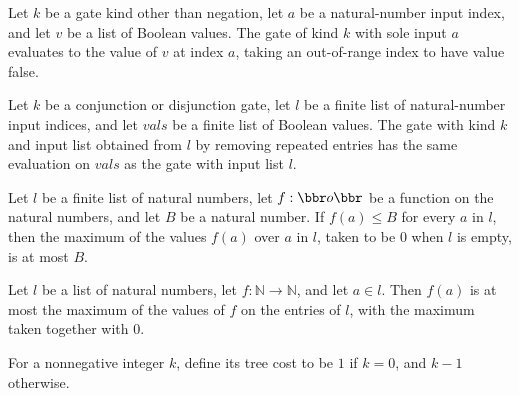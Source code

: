 \begin{theorem}
\label{BoolCircuit.DAGGate.eval_singleton}
\leanok
{}
Let $k$ be a gate kind other than negation, let $a$ be a natural-number input index, and
let $v$ be a list of Boolean values. The gate of kind $k$ with sole input $a$ evaluates
to the value of $v$ at index $a$, taking an out-of-range index to have value false.
\end{theorem}

\begin{theorem}
\label{BoolCircuit.DAGGate.eval_dedup}
\leanok
{}
Let $k$ be a conjunction or disjunction gate, let $l$ be a finite list of natural-number
input indices, and let $vals$ be a finite list of Boolean values. The gate with kind $k$
and input list obtained from $l$ by removing repeated entries has the same evaluation on
$vals$ as the gate with input list $l$.
\end{theorem}

\begin{theorem}
\leanok
{}
Let $l$ be a finite list of natural numbers, let $f:\bbr	o\bbr$ be a function on the
natural numbers, and let $B$ be a natural number. If $f(a)\le B$ for every $a$ in $l$,
then the maximum of the values $f(a)$ over $a$ in $l$, taken to be $0$ when $l$ is
empty, is at most $B$.
\end{theorem}

\begin{theorem}
\leanok
{}
Let $l$ be a list of natural numbers, let $f:\mathbb{N}\to\mathbb{N}$, and let $a\in l$.
Then $f(a)$ is at most the maximum of the values of $f$ on the entries of $l$, with the
maximum taken together with $0$.
\end{theorem}

\begin{definition}
\label{BoolCircuit.treeCost}
\leanok
For a nonnegative integer $k$, define its tree cost to be $1$ if $k=0$, and $k-1$
otherwise.
\end{definition}

